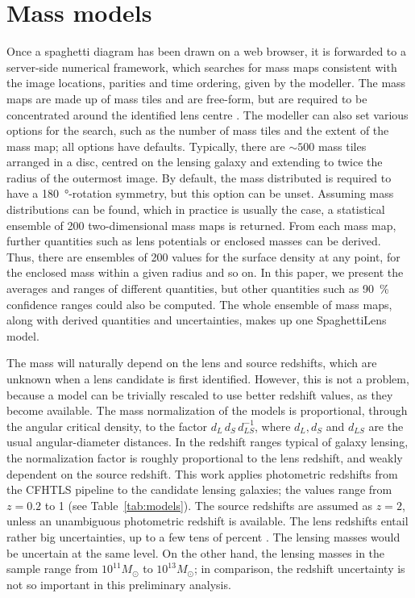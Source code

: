 
\section{Mass models}\label{sec:massmodels}



Once a spaghetti diagram has been drawn on a web browser, it is
forwarded to a server-side numerical framework, which searches for
mass maps consistent with the image locations, parities and time
ordering, given by the modeller.  The mass maps are made up of mass
tiles and are free-form, but are required to be concentrated around
the identified lens centre \citep[see][for the precise formulation of
  the search problem]{2014MNRAS.445.2181C}.  The modeller can also set
various options for the search, such as the number of mass tiles and
the extent of the mass map; all options have defaults.  Typically,
there are $\sim500$ mass tiles arranged in a disc, centred on the
lensing galaxy and extending to twice the radius of the outermost
image.  By default, the mass distributed is required to have a
\SI{180}{\degree}-rotation symmetry, but this option can be unset.  Assuming
mass distributions can be found, which in practice is usually the
case, a statistical ensemble of 200 two-dimensional mass maps is
returned.  From each mass map, further quantities such as lens
potentials or enclosed masses can be derived.  Thus, there are
ensembles of 200 values for the surface density at any point, for the
enclosed mass within a given radius and so on.  In this paper, we
present the averages and ranges of different quantities, but other
quantities such as \SI{90}{\%} confidence ranges could also be computed.  The
whole ensemble of mass maps, along with derived quantities and
uncertainties, makes up one SpaghettiLens model.

The mass will naturally depend on the lens and source redshifts, which
are unknown when a lens candidate is first identified.  However, this
is not a problem, because a model can be trivially rescaled to use
better redshift values, as they become available.  The mass
normalization of the models is proportional, through the angular
critical density, to the factor $d_L\, d_S\, d_{LS}^{-1}$, where
$d_L,d_S$ and $d_{LS}$ are the usual angular-diameter distances.  In
the redshift ranges typical of galaxy lensing, the normalization
factor is roughly proportional to the lens redshift, and weakly
dependent on the source redshift.  This work applies photometric
redshifts from the CFHTLS pipeline \citep{2009A&A...500..981C} to the
candidate lensing galaxies; the values range from $z=0.2$ to 1 (see
Table~\ref{tab:models}).  The source redshifts are assumed as $z=2$,
unless an unambiguous photometric redshift is available.  The lens
redshifts entail rather big uncertainties, up to a few tens of percent
\citep[see Fig.~5 in][]{2009A&A...500..981C}. The lensing masses would
be uncertain at the same level.  On the other hand, the lensing masses
in the sample range from $10^{11}M_\odot$ to $10^{13}M_\odot$; in
comparison, the redshift uncertainty is not so important in this
preliminary analysis.

